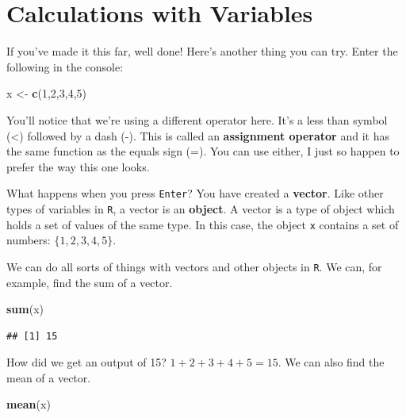 \documentclass[
]{book}
\newenvironment{Shaded}{\begin{snugshade}}{\end{snugshade}}
\newcommand{\DecValTok}[1]{\textcolor[rgb]{0.00,0.00,0.81}{#1}}
\newcommand{\FunctionTok}[1]{\textcolor[rgb]{0.13,0.29,0.53}{\textbf{#1}}}
\newcommand{\NormalTok}[1]{#1}
\newcommand{\OtherTok}[1]{\textcolor[rgb]{0.56,0.35,0.01}{#1}}
\begin{document}
\hypertarget{calculations-with-variables}{%
\section{Calculations with Variables}\label{calculations-with-variables}}

If you've made it this far, well done! Here's another thing you can try. Enter the following in the console:

\begin{Shaded}
\begin{Highlighting}[]
\NormalTok{x }\OtherTok{\textless{}{-}} \FunctionTok{c}\NormalTok{(}\DecValTok{1}\NormalTok{,}\DecValTok{2}\NormalTok{,}\DecValTok{3}\NormalTok{,}\DecValTok{4}\NormalTok{,}\DecValTok{5}\NormalTok{)}
\end{Highlighting}
\end{Shaded}

You'll notice that we're using a different operator here. It's a less than symbol (\textless) followed by a dash (-). This is called an \textbf{assignment operator} and it has the same function as the equals sign (=). You can use either, I just so happen to prefer the way this one looks.

What happens when you press \texttt{Enter}? You have created a \textbf{vector}. Like other types of variables in \texttt{R}, a vector is an \textbf{object}. A vector is a type of object which holds a set of values of the same type. In this case, the object \texttt{x} contains a set of numbers: \(\{1,2,3,4,5\}\).

We can do all sorts of things with vectors and other objects in \texttt{R}. We can, for example, find the sum of a vector.

\begin{Shaded}
\begin{Highlighting}[]
\FunctionTok{sum}\NormalTok{(x)}
\end{Highlighting}
\end{Shaded}

\begin{verbatim}
## [1] 15
\end{verbatim}

How did we get an output of 15? \(1+2+3+4+5 = 15\). We can also find the mean of a vector.

\begin{Shaded}
\begin{Highlighting}[]
\FunctionTok{mean}\NormalTok{(x)}
\end{Highlighting}
\end{Shaded}
\end{document}
